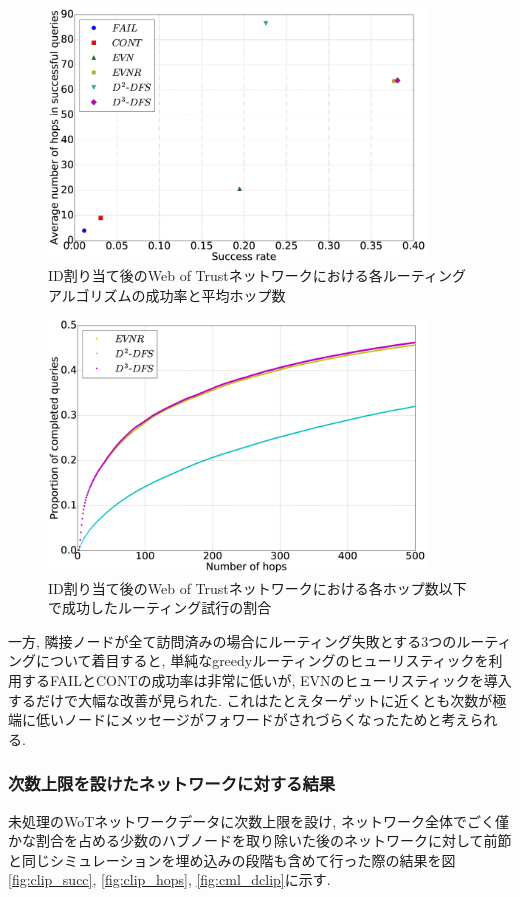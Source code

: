 \documentclass[dvipdfmx]{ampbt}
\begin{document}
   \begin{figure}[!htbp]
    \centerline{\includegraphics[width=100mm]{../fig/succ_hops_full.eps}}
    \caption{ID割り当て後のWeb of Trustネットワークにおける各ルーティングアルゴリズムの成功率と平均ホップ数}
    \label{fig:succ_hops_full}
   \end{figure}
   \begin{figure}[!htbp]
    \centerline{\includegraphics[width=100mm]{../fig/cml_noclip.eps}}
    \caption{ID割り当て後のWeb of Trustネットワークにおける各ホップ数以下で成功したルーティング試行の割合}
    \label{fig:cml_noclip}
   \end{figure}


   一方, 隣接ノードが全て訪問済みの場合にルーティング失敗とする3つのルーティングについて着目すると, 単純なgreedyルーティングのヒューリスティックを利用するFAILとCONTの成功率は非常に低いが, EVNのヒューリスティックを導入するだけで大幅な改善が見られた. これはたとえターゲットに近くとも次数が極端に低いノードにメッセージがフォワードがされづらくなったためと考えられる.

   \subsubsection{次数上限を設けたネットワークに対する結果}
   未処理のWoTネットワークデータに次数上限を設け, ネットワーク全体でごく僅かな割合を占める少数のハブノードを取り除いた後のネットワークに対して前節と同じシミュレーションを埋め込みの段階も含めて行った際の結果を図\ref{fig:clip_succ}, \ref{fig:clip_hops}, \ref{fig:cml_dclip}に示す.
\end{document}
